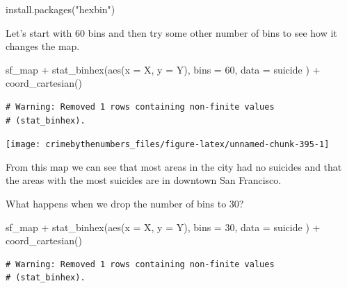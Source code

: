 \documentclass[
  a4paper,
]{krantz}
\makeatletter
\newenvironment{Shaded}{\begin{snugshade}}{\end{snugshade}}
\newcommand{\AttributeTok}[1]{\textcolor[rgb]{0.61,0.61,0.61}{#1}}
\newcommand{\DecValTok}[1]{\textcolor[rgb]{0.06,0.06,0.06}{#1}}
\newcommand{\FunctionTok}[1]{\textcolor[rgb]{0,0,0}{#1}}
\newcommand{\NormalTok}[1]{#1}
\newcommand{\SpecialCharTok}[1]{\textcolor[rgb]{0,0,0}{#1}}
\newcommand{\StringTok}[1]{\textcolor[rgb]{0.5,0.5,0.5}{#1}}
\newenvironment{kframe}{%
\medskip{}
\setlength{\fboxsep}{.8em}
 \def\at@end@of@kframe{}%
 \ifinner\ifhmode%
  \def\at@end@of@kframe{\end{minipage}}%
  \begin{minipage}{\columnwidth}%
 \fi\fi%
 \def\FrameCommand##1{\hskip\@totalleftmargin \hskip-\fboxsep
 \colorbox{shadecolor}{##1}\hskip-\fboxsep
     \hskip-\linewidth \hskip-\@totalleftmargin \hskip\columnwidth}%
 \MakeFramed {\advance\hsize-\width
   \@totalleftmargin\z@ \linewidth\hsize
   \@setminipage}}%
 {\par\unskip\endMakeFramed%
 \at@end@of@kframe}
\renewenvironment{Shaded}{\begin{kframe}}{\end{kframe}}
\makeatother
\begin{document}
\begin{Shaded}
\begin{Highlighting}[]
\FunctionTok{install.packages}\NormalTok{(}\StringTok{"hexbin"}\NormalTok{)}
\end{Highlighting}
\end{Shaded}

Let's start with 60 bins and then try some other number of
bins to see how it changes the map.

\begin{Shaded}
\begin{Highlighting}[]
\NormalTok{sf\_map }\SpecialCharTok{+}
  \FunctionTok{stat\_binhex}\NormalTok{(}\FunctionTok{aes}\NormalTok{(}\AttributeTok{x =}\NormalTok{ X, }\AttributeTok{y =}\NormalTok{ Y),}
    \AttributeTok{bins =} \DecValTok{60}\NormalTok{,}
    \AttributeTok{data =}\NormalTok{ suicide}
\NormalTok{  ) }\SpecialCharTok{+}
  \FunctionTok{coord\_cartesian}\NormalTok{()}
\end{Highlighting}
\end{Shaded}

\begin{verbatim}
# Warning: Removed 1 rows containing non-finite values
# (stat_binhex).
\end{verbatim}

\begin{center}\texttt{[image: crimebythenumbers\_files/figure-latex/unnamed-chunk-395-1]} \end{center}

From this map we can see that most areas in the city had no
suicides and that the areas with the most suicides are in
downtown San Francisco.

What happens when we drop the number of bins to 30?

\begin{Shaded}
\begin{Highlighting}[]
\NormalTok{sf\_map }\SpecialCharTok{+}
  \FunctionTok{stat\_binhex}\NormalTok{(}\FunctionTok{aes}\NormalTok{(}\AttributeTok{x =}\NormalTok{ X, }\AttributeTok{y =}\NormalTok{ Y),}
    \AttributeTok{bins =} \DecValTok{30}\NormalTok{,}
    \AttributeTok{data =}\NormalTok{ suicide}
\NormalTok{  ) }\SpecialCharTok{+}
  \FunctionTok{coord\_cartesian}\NormalTok{()}
\end{Highlighting}
\end{Shaded}

\begin{verbatim}
# Warning: Removed 1 rows containing non-finite values
# (stat_binhex).
\end{verbatim}
\end{document}
